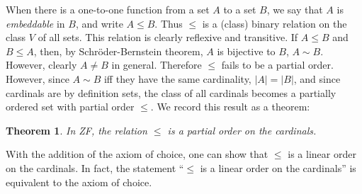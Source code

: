 \documentclass[12pt]{article}
\newtheorem{thm}{Theorem}
\begin{document}
When there is a one-to-one function from a set $A$ to a set $B$, we say that $A$ is \emph{embeddable} in $B$, and write $A \le B$.  Thus $\le$ is a (class) binary relation on the class $V$ of all sets.  This relation is clearly reflexive and transitive.  If $A\le B$ and $B\le A$, then, by Schr\"oder-Bernstein theorem, $A$ is bijective to $B$, $A\sim B$.  However, clearly $A\ne B$ in general.  Therefore $\le$ fails to be a partial order.  However, since $A\sim B$ iff they have the same cardinality, $|A|=|B|$, and since cardinals are by definition sets, the class of all cardinals becomes a partially ordered set with partial order $\le$.  We record this result as a theorem:

\begin{thm} In ZF, the relation $\le$ is a partial order on the cardinals. \end{thm}

With the addition of the axiom of choice, one can show that $\le$ is a linear order on the cardinals.  In fact, the statement ``$\le$ is a linear order on the cardinals'' is equivalent to the axiom of choice.
\end{document}
